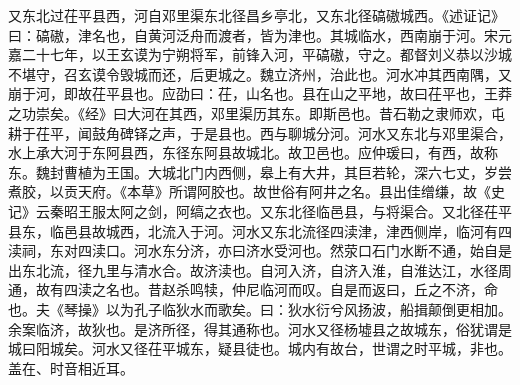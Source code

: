 \documentclass[12pt,UTF8]{ctexbook}
\begin{document}
又东北过茌平县西，河自邓里渠东北径昌乡亭北，又东北径碻磝城西。《述证记》曰：碻磝，津名也，自黄河泛舟而渡者，皆为津也。其城临水，西南崩于河。宋元嘉二十七年，以王玄谟为宁朔将军，前锋入河，平碻磝，守之。都督刘义恭以沙城不堪守，召玄谟令毁城而还，后更城之。魏立济州，治此也。河水冲其西南隅，又崩于河，即故茌平县也。应劭曰：茌，山名也。县在山之平地，故曰茌平也，王莽之功崇矣。《经》曰大河在其西，邓里渠历其东。即斯邑也。昔石勒之隶师欢，屯耕于茌平，闻鼓角碑铎之声，于是县也。西与聊城分河。河水又东北与邓里渠合，水上承大河于东阿县西，东径东阿县故城北。故卫邑也。应仲瑗曰，有西，故称东。魏封曹植为王国。大城北门内西侧，皋上有大井，其巨若轮，深六七丈，岁尝煮胶，以贡天府。《本草》所谓阿胶也。故世俗有阿井之名。县出佳缯缣，故《史记》云秦昭王服太阿之剑，阿缟之衣也。又东北径临邑县，与将渠合。又北径茌平县东，临邑县故城西，北流入于河。河水又东北流径四渎津，津西侧岸，临河有四渎祠，东对四渎口。河水东分济，亦曰济水受河也。然荥口石门水断不通，始自是出东北流，径九里与清水合。故济渎也。自河入济，自济入淮，自淮达江，水径周通，故有四渎之名也。昔赵杀鸣犊，仲尼临河而叹。自是而返曰，丘之不济，命也。夫《琴操》以为孔子临狄水而歌矣。曰：狄水衍兮风扬波，船揖颠倒更相加。余案临济，故狄也。是济所径，得其通称也。河水又径杨墟县之故城东，俗犹谓是城曰阳城矣。河水又径茌平城东，疑县徒也。城内有故台，世谓之时平城，非也。盖在、时音相近耳。
\end{document}
